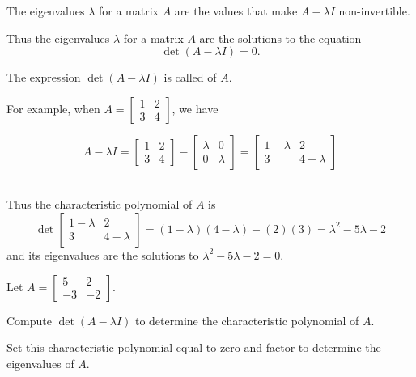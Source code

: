 \begin{fact}
  The eigenvalues \(\lambda\) for a matrix \(A\) are the values
  that make \(A-\lambda I\) non-invertible.

  \vspace{1em}

  Thus the eigenvalues \(\lambda\) for a matrix \(A\)
  are the solutions to
  the equation \[\det(A-\lambda I)=0.\]
\end{fact}

\begin{definition}
The expression \(\det(A-\lambda I)\) is called
 of \(A\). \\

\vspace{1em} 

For example, when
\(A=\begin{bmatrix}1 & 2 \\ 3 & 4\end{bmatrix}\), we have

\[
  A-\lambda I=
  \begin{bmatrix}1 & 2 \\ 3 & 4\end{bmatrix}-
  \begin{bmatrix}\lambda & 0 \\ 0 & \lambda\end{bmatrix}=
  \begin{bmatrix}1-\lambda & 2 \\ 3 & 4-\lambda\end{bmatrix}
\]

\ \\
Thus the characteristic polynomial of \(A\) is
\[
  \det\begin{bmatrix}1-\lambda & 2 \\ 3 & 4-\lambda\end{bmatrix}
=
  (1-\lambda)(4-\lambda)-(2)(3)
=
  \lambda^2-5\lambda-2
\]
and its eigenvalues are the solutions to \(\lambda^2-5\lambda-2=0\).
\end{definition}


\begin{activity}{10}
Let $A = \begin{bmatrix} 5 & 2 \\ -3 & -2 \end{bmatrix}$.
\begin{subactivity}
Compute $\det (A-\lambda I)$ to determine the characteristic polynomial of $A$.
\end{subactivity}
\begin{subactivity}
Set this characteristic polynomial equal to zero and factor to determine the eigenvalues of $A$.
\end{subactivity}
\end{activity}

